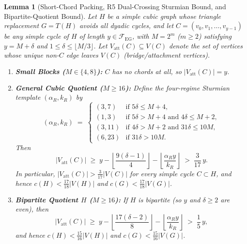 \documentclass[11pt,reqno]{amsart}
\theoremstyle{plain}
\newtheorem{lemma}[theorem]{Lemma}
\theoremstyle{definition}
\theoremstyle{remark}
\newcommand{\FEG}{\mathcal{F}_{\mathrm{EG}}}
\newcommand{\Vatt}{V_{\mathrm{att}}}
\DeclareRobustCommand{\_}{\ifmmode\text{\textunderscore}\else\textunderscore\allowbreak\fi}
\begin{document}
\begin{lemma}[Short-Chord Packing, R5 Dual-Crossing Sturmian Bound, and Bipartite-Quotient Bound]\label{lem:r5}
Let $H$ be a simple cubic graph whose triangle replacement $G = T(H)$ avoids all dyadic cycles, and let $C = (v_0, v_1, \dots, v_{y-1})$ be any simple cycle of $H$ of length $y \in \FEG$, with $M = 2^m$ ($m \ge 2$) satisfying $y = M + \delta$ and $1 \le \delta \le \lfloor M/3 \rfloor$. Let $\Vatt(C) \subseteq V(C)$ denote the set of vertices whose unique non-$C$ edge leaves $V(C)$ (bridge/attachment vertices).
\begin{enumerate}[label=(\roman*),leftmargin=2.2em]
  \item \textbf{Small Blocks ($M \in \{4, 8\}$):} $C$ has no chords at all, so $|\Vatt(C)| = y$.
  \item \textbf{General Cubic Quotient ($M \ge 16$):} Define the four-regime Sturmian template $(\alpha_R, k_R)$ by
  \[
    (\alpha_R, k_R) \;=\;
    \begin{cases}
      (3, 7)  & \text{if } 5\delta \le M + 4,\\
      (1, 3)  & \text{if } 5\delta > M + 4 \text{ and } 4\delta \le M + 2,\\
      (3, 11) & \text{if } 4\delta > M + 2 \text{ and } 31\delta \le 10M,\\
      (6, 23) & \text{if } 31\delta > 10M.
    \end{cases}
  \]
  Then
  \begin{equation}\label{eq:r5-attach}
    |\Vatt(C)| \;\ge\; y - \left\lfloor \frac{9(\delta - 1)}{4} \right\rfloor - \left\lfloor \frac{\alpha_R y}{k_R} \right\rfloor \;>\; \frac{3}{17}\, y.
  \end{equation}
  In particular, $|\Vatt(C)| > \frac{3}{17}|V(C)|$ for \emph{every} simple cycle $C \subset H$, and hence $c(H) < \frac{17}{18}|V(H)|$ and $c(G) < \frac{17}{18}|V(G)|$.
  \item \textbf{Bipartite Quotient $H$ ($M \ge 16$):} If $H$ is \emph{bipartite} (so $y$ and $\delta \ge 2$ are even), then
  \begin{equation}\label{eq:r11-bip}
    |\Vatt(C)| \;\ge\; y - \left\lfloor \frac{17(\delta - 2)}{8} \right\rfloor - \left\lfloor \frac{\alpha_R y}{k_R} \right\rfloor \;>\; \frac{1}{5}\, y,
  \end{equation}
  and hence $c(H) < \frac{15}{16}|V(H)|$ and $c(G) < \frac{15}{16}|V(G)|$.
\end{enumerate}
\end{lemma}
\end{document}
